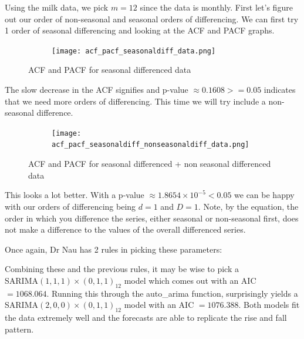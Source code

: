 \documentclass{article}
\begin{document}
  Using the milk data, we pick $m = 12$ since the data is monthly.
  First let's figure out our order of non-seasonal and seasonal orders of differencing. We can first try 1 order of seasonal differencing and looking at the ACF and PACF graphs.
  \begin{figure}[H]
    \centering
    \captionsetup{justification=centering}
    \begin{subfigure}[b]{\linewidth}
      \texttt{[image: acf\_pacf\_seasonaldiff\_data.png]}
    \end{subfigure}
    \caption{ACF and PACF for seasonal differenced data}
  \end{figure}

  The slow decrease in the ACF signifies and p-value $\approx 0.1608 >=0.05$ indicates that we need more orders of differencing. This time we will try include a non-seasonal difference.
  \begin{figure}[H]
    \centering
    \captionsetup{justification=centering}
    \begin{subfigure}[b]{\linewidth}
      \texttt{[image: acf\_pacf\_seasonaldiff\_nonseasonaldiff\_data.png]}
    \end{subfigure}
    \caption{ACF and PACF for seasonal differenced + non seasonal differenced data}
  \end{figure}

  This looks a lot better. With a p-value $\approx 1.8654\times10^{-5}<0.05$ we can be happy with our orders of differencing being $d=1$ and $D=1$. Note, by the equation, the order in which you difference the series, either seasonal or non-seasonal first, does not make a difference to the values of the overall differenced series.
  
  Once again, Dr Nau has 2 rules in picking these parameters:
  \newline
  \emph{\\
  }

  Combining these and the previous rules, it may be wise to pick a\\
  SARIMA$(1,1,1)\times(0,1,1)_{12}$ model which comes out with an AIC $=1068.064$. Running this through the
  auto\_arima function, surprisingly yields a SARIMA$(2,0,0)\times(0,1,1)_{12}$ model with an AIC $=1076.388$. Both models fit the data extremely well and the forecasts are able to replicate the rise and fall pattern.
\end{document}
